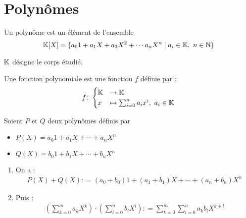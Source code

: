 \chapter{Polynômes}

\begin{graybox}
    \begin{definition}[Polynôme]
        Un polynôme est un élément de l'ensemble 
        \begin{align*}
            \mathbb{K}[X] = \{ a_0 1 + a_1 X + a_2 X^2 + \cdots a_n X^n \mid a_i \in \mathbb{K},\ n \in \mathbb{N} \}
        \end{align*}
    \end{definition}
\end{graybox}

\begin{remarque}
$\mathbb{K}$ désigne le corps étudié.
\end{remarque}
\begin{graybox}
    \begin{definition}
        Une fonction polynomiale est une fonction $f$ définie par :
        \begin{align*}
            f \colon 
            \begin{cases}
                \mathbb{K} &\to \mathbb{K} \\
                x &\mapsto \sum_{i = 0}^{n} a_i x^i,\ a_i \in \mathbb{K}
            \end{cases}
        \end{align*}
    \end{definition}
\end{graybox}

Soient $P$ et $Q$ deux polynômes définis par 
                \begin{itemize}
                    \item $P(X) = a_0 1 + a_1 X + \cdots + a_n X^n$
                    \item $Q(X) = b_0 1 + b_1 X+ \cdots + b_n X^n$
                \end{itemize}

        \begin{enumerate}
            \item On a :
            \begin{align*}
                P(X) + Q(X) \colon = (a_0 + b_0) 1 + (a_1 + b_1) X + \cdots + (a_n + b_n) X^n
            \end{align*}
        \item Puis :
            \begin{align*}
                (\sum_{k = 0}^m a_k X^k) \cdot (\sum_{l = 0}^{n} b_l X^l) \colon = \sum_{k = 0}^m \sum_{l = 0}^n a_k b_l X^{k + l}
            \end{align*}
\end{enumerate}

